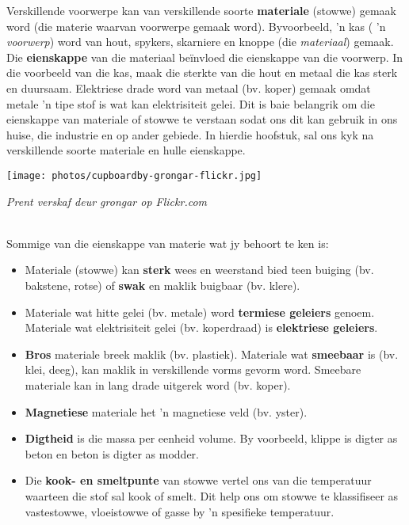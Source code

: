 \begin{minipage}{.5\textwidth}
Verskillende voorwerpe kan van verskillende soorte \textbf{materiale} (stowwe) gemaak word (die materie waarvan voorwerpe gemaak word). Byvoorbeeld, 'n kas ( 'n \textsl{voorwerp}) word van hout, spykers, skarniere en knoppe (die \textsl{materiaal}) gemaak. Die \textbf{eienskappe} van die materiaal be\"invloed die eienskappe van die voorwerp. In die voorbeeld van die kas, maak die sterkte van die hout en metaal die kas sterk en duursaam. Elektriese drade word van metaal (bv. koper) gemaak omdat metale 'n tipe stof is wat kan elektrisiteit gelei. Dit is baie belangrik om die eienskappe van materiale of stowwe te verstaan sodat ons dit kan gebruik in ons huise, die industrie en op ander gebiede. In hierdie hoofstuk, sal ons kyk na verskillende soorte materiale en hulle eienskappe.\par 
\end{minipage}
\begin{minipage}{.5\textwidth}
\begin{center}
 \texttt{[image: photos/cupboardby-grongar-flickr.jpg]}\par
\textit{Prent verskaf deur grongar op Flickr.com}
\end{center}
\end{minipage} \\
\label{m38708*id0132}Sommige van die eienskappe van materie wat jy behoort te ken is:
\label{m38708*lid825}\begin{itemize}[noitemsep]
  \item Materiale (stowwe) kan \textbf{sterk} wees en weerstand bied teen buiging (bv. bakstene, rotse) of \textbf{swak} en maklik buigbaar (bv. klere).
  \item Materiale wat hitte gelei (bv. metale) word \textbf{termiese geleiers} genoem. Materiale wat elektrisiteit gelei (bv. koperdraad) is \textbf{elektriese geleiers}.
  \item \textbf{Bros} materiale breek maklik (bv. plastiek). Materiale wat \textbf{smeebaar} is (bv. klei, deeg), kan maklik in verskillende vorms gevorm word. Smeebare materiale kan in lang drade uitgerek word (bv. koper).
  \item \textbf{Magnetiese} materiale het 'n magnetiese veld (bv. yster).
  \item \textbf{Digtheid} is die massa per eenheid volume. By voorbeeld, klippe is digter as beton en beton is digter as modder.
  \item Die \textbf{kook- en smeltpunte} van stowwe vertel ons van die temperatuur waarteen die stof sal kook of smelt. Dit help ons om stowwe te klassifiseer as vastestowwe, vloeistowwe of gasse by 'n spesifieke temperatuur.\end{itemize}
\par 

